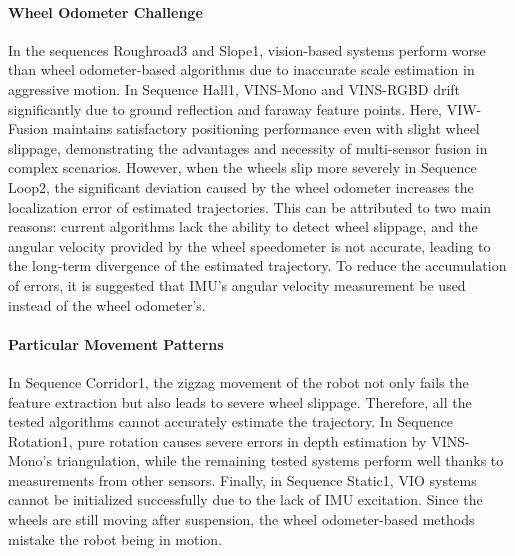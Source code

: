 \documentclass[conference]{IEEEtran}
\begin{document}
	

	
	\paragraph{Wheel Odometer Challenge}

In the sequences Roughroad3 and Slope1, vision-based systems perform worse than wheel odometer-based algorithms due to inaccurate scale estimation in aggressive motion. In Sequence Hall1, VINS-Mono \cite{qin2018vins} and VINS-RGBD \cite{shan2019rgbd} drift significantly due to ground reflection and faraway feature points. Here, VIW-Fusion \cite{Tingda2022VIW} maintains satisfactory positioning performance even with slight wheel slippage, demonstrating the advantages and necessity of multi-sensor fusion in complex scenarios. However, when the wheels slip more severely in Sequence Loop2, the significant deviation caused by the wheel odometer increases the localization error of estimated trajectories. This can be attributed to two main reasons: current algorithms lack the ability to detect wheel slippage, and the angular velocity provided by the wheel speedometer is not accurate, leading to the long-term divergence of the estimated trajectory. To reduce the accumulation of errors, it is suggested that IMU's angular velocity measurement be used instead of the wheel odometer's.



	
\paragraph{Particular Movement Patterns}
In Sequence Corridor1, the zigzag movement of the robot not only fails the feature extraction but also leads to severe wheel slippage. Therefore, all the tested algorithms cannot accurately estimate the trajectory. In Sequence Rotation1, pure rotation causes severe errors in depth estimation by VINS-Mono's triangulation, while the remaining tested systems perform well thanks to measurements from other sensors. Finally, in Sequence Static1, VIO systems cannot be initialized successfully due to the lack of IMU excitation. Since the wheels are still moving after suspension, the wheel odometer-based methods mistake the robot being in motion.
\end{document}
